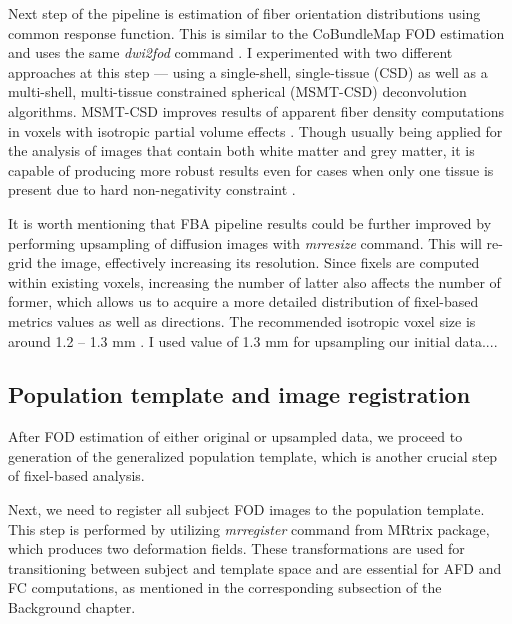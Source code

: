 \documentclass[thesis.tex]{subfiles}
\begin{document}
Next step of the pipeline is estimation of fiber orientation distributions using common response function. This is similar to the CoBundleMap FOD estimation and uses the same \textit{dwi2fod} command \cite{dwi2fod}. I experimented with two different approaches at this step --- using a single-shell, single-tissue (CSD) \cite{dwi2fod2-csd} as well as a multi-shell, multi-tissue constrained spherical (MSMT-CSD) \cite{dwi2fod2-msmt-csd} deconvolution algorithms. MSMT-CSD improves results of apparent fiber density computations in voxels with isotropic partial volume effects \cite{dwi2fod2-msmt-csd}. Though usually being applied for the analysis of images that contain both white matter and grey matter, it is capable of producing more robust results even for cases when only one tissue is present due to hard non-negativity constraint \cite{mrtrixDocu}.

It is worth mentioning that FBA pipeline results could be further improved by performing upsampling of diffusion images with \textit{mrresize} command. This will re-grid the image, effectively increasing its resolution. Since fixels are computed within existing voxels, increasing the number of latter also affects the number of former, which allows us to acquire a more detailed distribution of fixel-based metrics values as well as directions. The recommended isotropic voxel size is around 1.2 -- 1.3 mm \cite{mrtrixDocu}. I used value of 1.3 mm for upsampling our initial data....

\subsection{Population template and image registration}
After FOD estimation of either original or upsampled data, we proceed to generation of the generalized population template, which is another crucial step of fixel-based analysis. 

Next, we need to register all subject FOD images to the population template. This step is performed by utilizing \textit{mrregister} \cite{mrregister, mrregister2} command from MRtrix package, which produces two deformation fields. These transformations are used for transitioning between subject and template space and are essential for AFD and FC computations, as mentioned in the corresponding subsection of the Background chapter.
\end{document}
